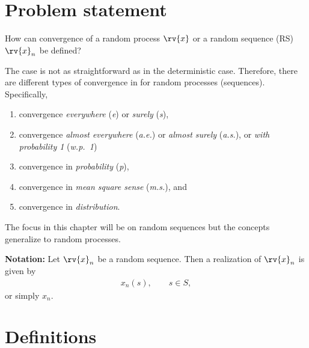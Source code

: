\section{Problem statement}
How can convergence of a random process $\rv{x}$ or a random sequence (RS) $\rv{x}_{n}$ be defined?

The case is not as straightforward as in the deterministic case. Therefore, there are different types of convergence in for random processes (sequences). Specifically, 
\begin{enumerate}
    \item convergence \emph{everywhere} (\emph{e}) or \emph{surely} (\emph{s}),
    \item convergence \emph{almost everywhere} (\emph{a.e.}) or \emph{almost surely} (\emph{a.s.}), or \emph{with probability 1} (\emph{w.p.~1})
    \item convergence in \emph{probability} (\emph{p}),
    \item convergence in \emph{mean square sense} (\emph{m.s.}), and
    \item convergence in \emph{distribution}.
\end{enumerate}
The focus in this chapter will be on random sequences but the concepts generalize to random processes.

\begin{myBlueBox}
    \textbf{Notation:}
    Let $\rv{x}_{n}$ be a random sequence. Then a realization of $\rv{x}_{n}$ is given by
    \begin{align}
        x_{n}(s), \qquad s\in S,
    \end{align}
    or simply $x_{n}$.
\end{myBlueBox}
\section{Definitions}
